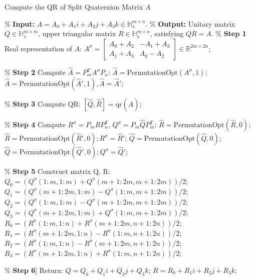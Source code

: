 \documentclass[3p]{elsarticle}
\numberwithin{equation}{section}
\begin{document}
\begin{algorithm}[htbp] 
    \caption{Compute the QR of Split Quaternion Matrix \(A\)}
    \label{alg:QR}
    \begin{algorithmic}
        \State \% \textbf{Input:} \(A = A_0 + A_1 i + A_2 j + A_3 k \in \mathbb{H}_s^{m\times n}\).
        \State \% \textbf{Output:} Unitary matrix \(Q \in \mathbb{H}_s^{m\times m}\), upper triangular matrix \(R \in \mathbb{H}_s^{m\times n}\), satisfying \(Q  R = A\).
        \State \% \textbf{Step 1} Real representation of $A$:
        \State \(A^\sigma = \begin{bmatrix}
            A_0 + A_2 & -A_1 + A_3 \\ 
            A_1 + A_3 & A_0 - A_2
            \end{bmatrix} \in \mathbb{R}^{2m\times 2n}\);
        \State
        
        \State \% \textbf{Step 2} Compute \(\widehat{A} = P_{m}^T A^\sigma P_{n}\): 
        \State $\widehat{A}=\text{PermutationOpt}(A^\sigma,1);$ 
        \State $\widehat{A}=\text{PermutationOpt}(\widehat{A}',1),\widehat{A}=\widehat{A}';$
        \State
        
        \State \% \textbf{Step 3} Compute QR:
        \State \([\widehat{Q},\widehat{R}] = \text{qr}(\widehat{A})\);
        \State
        
        \State \% \textbf{Step 4} Compute \(R^\sigma = P_{m}\widehat{R}P_{n}^T\), \(Q^\sigma =      P_{m}\widehat{Q}P_{m}^T\): 
        \State $\widehat{R}=\text{PermutationOpt}(\widehat{R},0)$;
        \State $\widehat{R}=\text{PermutationOpt}(\widehat{R}',0);R^\sigma=\widehat{R}'$;
        \State $\widehat{Q}=\text{PermutationOpt}(\widehat{Q},0)$;
        \State $\widehat{Q}=\text{PermutationOpt}(\widehat{Q}',0);Q^\sigma=\widehat{Q}'$;
        \State
        
        \State \% \textbf{Step 5} Construct matrix Q, R:
        \State $Q_0 = (Q^\sigma(1\!:\!m,1\!:\!m) + Q^\sigma(m+1\!:\!2m,m+1\!:\!2m))/2$;
        \State $Q_1 = (Q^\sigma(m+1\!:\!2m,1\!:\!m) - Q^\sigma(1\!:\!m,m+1\!:\!2m))/2$;
        \State $Q_2 = (Q^\sigma(1\!:\!m,1\!:\!m) - Q^\sigma(m+1\!:\!2m,m+1\!:\!2m))/2$;
        \State $Q_3 = (Q^\sigma(m+1\!:\!2m,1\!:\!m) + Q^\sigma(1\!:\!m,m+1\!:\!2m))/2$;
        \State $R_0 = (R^\sigma(1\!:\!m,1\!:\!n) + R^\sigma(m+1\!:\!2m,n+1\!:\!2n))/2$;
        \State $R_1 = (R^\sigma(m+1\!:\!2m,1\!:\!n) - R^\sigma(1\!:\!m,n+1\!:\!2n))/2$;
        \State $R_2 = (R^\sigma(1\!:\!m,1\!:\!n) - R^\sigma(m+1\!:\!2m,n+1\!:\!2n))/2$;
        \State $R_3 = (R^\sigma(m+1\!:\!2m,1\!:\!n) + R^\sigma(1\!:\!m,n+1\!:\!2n))/2$;
        \State
        
        \State \% \textbf{Step 6}] Return: 
        \State $Q = Q_0 + Q_1i + Q_2j + Q_3k$;
        \State $R = R_0 + R_1i + R_2j + R_3k$;
    \End 
    \end{algorithmic}
\end{algorithm}
\end{document}
